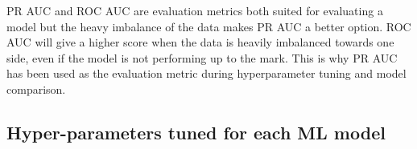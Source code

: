 \documentclass{article}
\begin{document}
PR AUC and ROC AUC are evaluation metrics both suited for evaluating a model but the heavy imbalance of the data makes PR AUC a better option. ROC AUC will give a higher score when the data is heavily imbalanced towards one side, even if the model is not performing up to the mark. This is why PR AUC has been used as the evaluation metric during hyperparameter tuning and model comparison.

\newpage
\subsection{Hyper-parameters tuned for each ML model}


\end{document}
